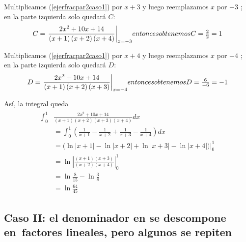 Multiplicamos (\ref{ejerfracpar2caso1}) por $x+3$ y luego reemplazamos $x$ por $-3$%
; en la parte izquierda solo quedará $C$:
\[
  C=\left. \frac{2x^{2}+10x+14}{\left( x+1\right) \left( x+2\right) \left(
  x+4\right) }\right\vert _{x=-3}$$ entonces obtenemos $$C=\frac{2}{2}=1
\]

Multiplicamos (\ref{ejerfracpar2caso1}) por $x+4$ y luego reemplazamos $x$ por $-4$%
; en la parte izquierda solo quedará $D$:
\[
  D=\left. \frac{2x^{2}+10x+14}{\left( x+1\right) \left( x+2\right) \left(
  x+3\right) }\right\vert _{x=-4}$$ entonces obtenemos $$D=\frac{6}{-6}=-1
\]

Así, la integral queda
\begin{gather*}
  \begin{aligned}
    \int_{0}^{1}&\frac{2x^{2}+10x+14}{\left( x+1\right) \left( x+2\right) \left(
    x+3\right) \left( x+4\right) }dx\\
    &=\int_{0}^{1}\left( \frac{1}{x+1}-\frac{1}{x+2}+\frac{1}{x+3}-\frac{1}{x+4}\right) dx\\
    &=\big( \ln \left\vert x+1\right\vert -\ln \left\vert x+2\right\vert +\ln \left\vert x+3\right\vert-\ln \left\vert x+4\right\vert \big)\vert _{0}^{1}\\
    &=\ln \left\vert \frac{\left( x+1\right) \left( x+3\right) }{\left(x+2\right) \left( x+4\right) }\right\vert _{0}^{1}\\
    &=\ln \frac{8}{15}-\ln \frac{3}{8}\\
    &=\ln \frac{64}{45}
  \end{aligned}
\end{gather*}

\subsection{Caso II: el denominador en \texorpdfstring{\protect{}}{p(x)/q(x)} se descompone en~factores lineales, pero algunos se repiten}\label{repetidos}


